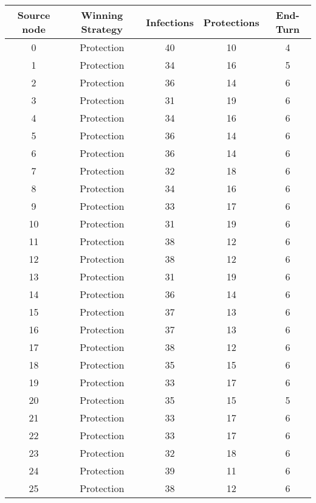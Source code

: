 \documentclass[results.tex]{subfiles}
\begin{document}
\begin{center}
  \begin{tabular}{| c || c | c | c | c |}
    \hline
    {\bfseries Source node} & {\bfseries Winning Strategy} & {\bfseries Infections} & {\bfseries Protections} & {\bfseries End-Turn} \\  %
    \hline\hline
    0 & Protection & 40 & 10 & 4 \\ 
    \hline
    1 & Protection & 34 & 16 & 5 \\ 
    \hline
    2 & Protection & 36 & 14 & 6 \\ 
    \hline
    3 & Protection & 31 & 19 & 6 \\ 
    \hline
    4 & Protection & 34 & 16 & 6 \\ 
    \hline
    5 & Protection & 36 & 14 & 6 \\ 
    \hline
    6 & Protection & 36 & 14 & 6 \\ 
    \hline
    7 & Protection & 32 & 18 & 6 \\ 
    \hline
    8 & Protection & 34 & 16 & 6 \\ 
    \hline
    9 & Protection & 33 & 17 & 6 \\ 
    \hline
    10 & Protection & 31 & 19 & 6 \\ 
    \hline
    11 & Protection & 38 & 12 & 6 \\ 
    \hline
    12 & Protection & 38 & 12 & 6 \\ 
    \hline
    13 & Protection & 31 & 19 & 6 \\ 
    \hline
    14 & Protection & 36 & 14 & 6 \\ 
    \hline
    15 & Protection & 37 & 13 & 6 \\ 
    \hline
    16 & Protection & 37 & 13 & 6 \\ 
    \hline
    17 & Protection & 38 & 12 & 6 \\ 
    \hline
    18 & Protection & 35 & 15 & 6 \\ 
    \hline
    19 & Protection & 33 & 17 & 6 \\ 
    \hline
    20 & Protection & 35 & 15 & 5 \\ 
    \hline
    21 & Protection & 33 & 17 & 6 \\ 
    \hline
    22 & Protection & 33 & 17 & 6 \\ 
    \hline
    23 & Protection & 32 & 18 & 6 \\ 
    \hline
    24 & Protection & 39 & 11 & 6 \\ 
    \hline
    25 & Protection & 38 & 12 & 6 \\ 

\end{tabular}
\end{center}
\end{document}
